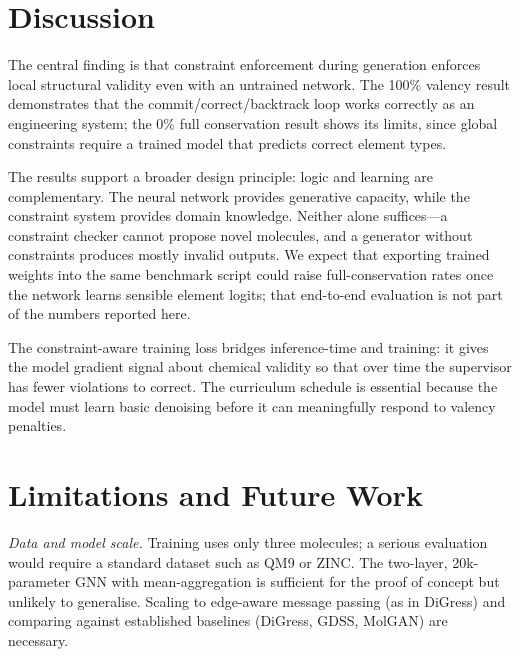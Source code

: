 \documentclass[11pt]{article}
\begin{document}
\section{Discussion}

The central finding is that constraint enforcement during generation
enforces local structural validity even with an untrained network. The
100\% valency result demonstrates that the commit/correct/backtrack
loop works correctly as an engineering system; the 0\% full conservation
result shows its limits, since global constraints require a trained
model that predicts correct element types.

The results support a broader design principle: logic and learning are
complementary. The neural network provides generative capacity, while
the constraint system provides domain knowledge. Neither alone
suffices---a constraint checker cannot propose novel molecules, and a
generator without constraints produces mostly invalid outputs. We expect that exporting trained weights into the same benchmark script
could raise full-conservation rates once the network learns sensible
element logits; that end-to-end evaluation is not part of the numbers
reported here.

The constraint-aware training loss bridges inference-time and training:
it gives the model gradient signal about chemical validity so that over
time the supervisor has fewer violations to correct. The curriculum
schedule is essential because the model must learn basic denoising
before it can meaningfully respond to valency penalties.

\section{Limitations and Future Work}
\label{sec:future}

\emph{Data and model scale.} Training uses only three molecules; a
serious evaluation would require a standard dataset such as
QM9 or ZINC. The
two-layer, 20k-parameter GNN with mean-aggregation is sufficient for
the proof of concept but unlikely to generalise. Scaling to edge-aware
message passing (as in DiGress) and comparing
against established baselines (DiGress, GDSS, MolGAN) are necessary.
\end{document}
